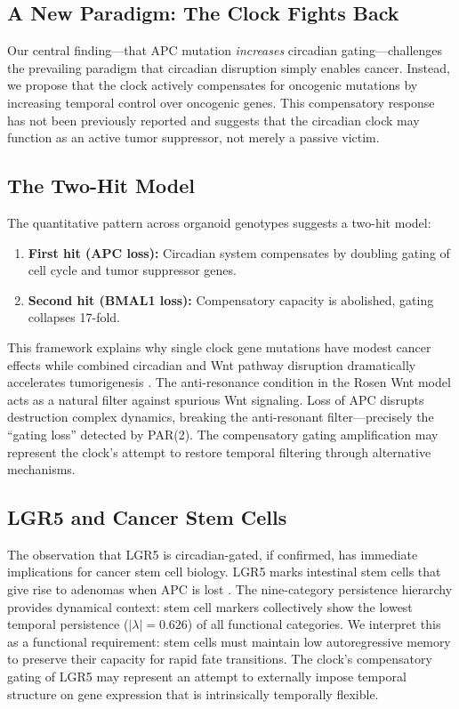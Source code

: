 \documentclass[11pt,a4paper]{article}
\begin{document}
\subsection{A New Paradigm: The Clock Fights Back}

Our central finding---that APC mutation \textit{increases} circadian gating---challenges the prevailing paradigm that circadian disruption simply enables cancer. Instead, we propose that the clock actively compensates for oncogenic mutations by increasing temporal control over oncogenic genes. This compensatory response has not been previously reported and suggests that the circadian clock may function as an active tumor suppressor, not merely a passive victim.

\subsection{The Two-Hit Model}

The quantitative pattern across organoid genotypes suggests a two-hit model:

\begin{enumerate}[noitemsep]
    \item \textbf{First hit (APC loss):} Circadian system compensates by doubling gating of cell cycle and tumor suppressor genes.
    \item \textbf{Second hit (BMAL1 loss):} Compensatory capacity is abolished, gating collapses 17-fold.
\end{enumerate}

This framework explains why single clock gene mutations have modest cancer effects while combined circadian and Wnt pathway disruption dramatically accelerates tumorigenesis \citep{chun2022}. The anti-resonance condition in the Rosen Wnt model \citep{rosen2026} acts as a natural filter against spurious Wnt signaling. Loss of APC disrupts destruction complex dynamics, breaking the anti-resonant filter---precisely the ``gating loss'' detected by PAR(2). The compensatory gating amplification may represent the clock's attempt to restore temporal filtering through alternative mechanisms.

\subsection{LGR5 and Cancer Stem Cells}

The observation that LGR5 is circadian-gated, if confirmed, has immediate implications for cancer stem cell biology. LGR5 marks intestinal stem cells that give rise to adenomas when APC is lost \citep{barker2007}. The nine-category persistence hierarchy provides dynamical context: stem cell markers collectively show the lowest temporal persistence ($|\lambda| = 0.626$) of all functional categories. We interpret this as a functional requirement: stem cells must maintain low autoregressive memory to preserve their capacity for rapid fate transitions. The clock's compensatory gating of LGR5 may represent an attempt to externally impose temporal structure on gene expression that is intrinsically temporally flexible.
\end{document}
